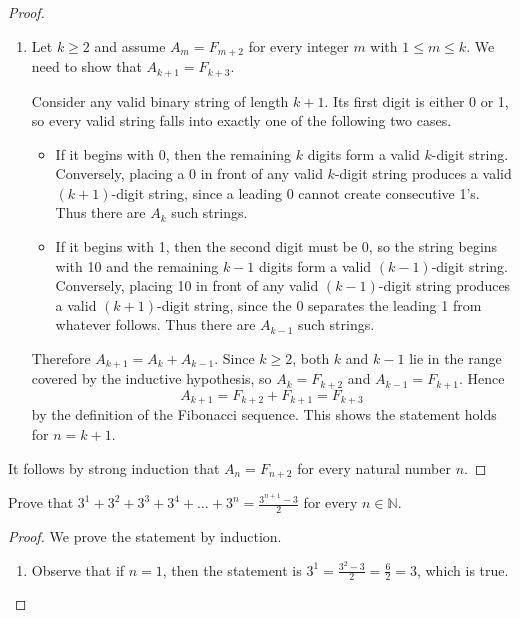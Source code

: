 \documentclass[DIN, pagenumber=false, fontsize=11pt, parskip=half]{scrartcl}
\begin{document}
\begin{problems}
\begin{proof}
\begin{enumerate}
                If $n=2$, then the valid strings are 00, 01, and 10, so $A_2 = 3 = F_4$.

                Thus the statement holds for $n=1$ and $n=2$.

            \item Let $k \geq 2$ and assume $A_m = F_{m+2}$ for every integer $m$ with $1 \leq m \leq k$. We need to show that $A_{k+1} = F_{k+3}$.

                Consider any valid binary string of length $k+1$. Its first digit is either 0 or 1, so every valid string falls into exactly one of the following two cases.
                \begin{itemize}
                    \item If it begins with 0, then the remaining $k$ digits form a valid $k$-digit string. Conversely, placing a 0 in front of any valid $k$-digit string produces a valid $(k+1)$-digit string, since a leading 0 cannot create consecutive 1's. Thus there are $A_k$ such strings.
                    \item If it begins with 1, then the second digit must be 0, so the string begins with 10 and the remaining $k-1$ digits form a valid $(k-1)$-digit string. Conversely, placing 10 in front of any valid $(k-1)$-digit string produces a valid $(k+1)$-digit string, since the 0 separates the leading 1 from whatever follows. Thus there are $A_{k-1}$ such strings.
                \end{itemize}
                Therefore $A_{k+1} = A_k + A_{k-1}$. Since $k \geq 2$, both $k$ and $k-1$ lie in the range covered by the inductive hypothesis, so $A_k = F_{k+2}$ and $A_{k-1} = F_{k+1}$. Hence
                \[
                    A_{k+1} = F_{k+2} + F_{k+1} = F_{k+3}
                \]
                by the definition of the Fibonacci sequence. This shows the statement holds for $n = k+1$.
        \end{enumerate}
        It follows by strong induction that $A_n = F_{n+2}$ for every natural number $n$.
    \end{proof}

    \problem Prove that $3^1+3^2+3^3+3^4+\dots +3^n = \frac{3^{n+1}-3}{2}$ for every $n \in \mathbb{N}$.
    \begin{proof}
        We prove the statement by induction.
        \begin{enumerate}
            \item Observe that if $n=1$, then the statement is $3^1 = \frac{3^2-3}{2} = \frac{6}{2} = 3$, which is true.


\end{enumerate}
\end{proof}
\end{problems}
\end{document}
